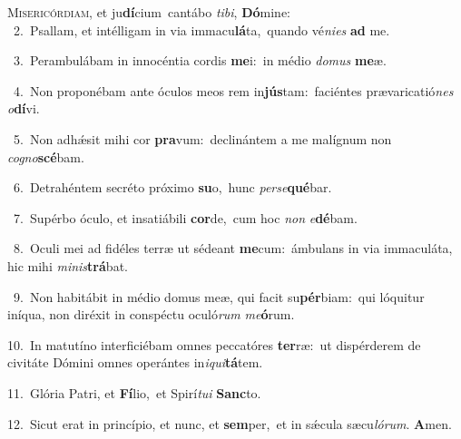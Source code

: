 \lettrine{\initial\textcolor{\initialcolor}{M}}{isericórdiam,} et ju\-\textbf{dí}\-cium~\star cantábo \textit{ti}\-\textit{bi}, \textbf{Dó}\-mine:\\
{\numbfont\textcolor{\numbcolor}{~2.}}~Psallam, et intélligam in via immacu\-\textbf{lá}\-ta,~\star quando vé\-\textit{ni}\-\textit{es} \textbf{ad} me.\par
{\numbfont\textcolor{\numbcolor}{~3.}}~Perambulábam in innocéntia cordis \textbf{me}\-i:~\star in médio \textit{do}\-\textit{mus} \textbf{me}\-æ.\par
{\numbfont\textcolor{\numbcolor}{~4.}}~Non proponébam ante óculos meos rem in\-\textbf{jús}\-tam:~\star faciéntes prævaricatió\textit{nes} \textit{o}\-\textbf{dí}vi.\par
{\numbfont\textcolor{\numbcolor}{~5.}}~Non adhǽsit mihi cor \textbf{pra}\-vum:~\star declinántem a me malígnum non \textit{co}\-\textit{gno}\textbf{scé}bam.\par
{\numbfont\textcolor{\numbcolor}{~6.}}~Detrahéntem secréto próximo \textbf{su}\-o,~\star hunc \textit{per}\-\textit{se}\textbf{qué}bar.\par
{\numbfont\textcolor{\numbcolor}{~7.}}~Supérbo óculo, et insatiábili \textbf{cor}\-de,~\star cum hoc \textit{non} \textit{e}\-\textbf{dé}bam.\par
{\numbfont\textcolor{\numbcolor}{~8.}}~Oculi mei ad fidéles terræ ut sédeant \textbf{me}\-cum:~\star ámbulans in via immaculáta, hic mihi \textit{mi}\-\textit{nis}\textbf{trá}bat.\par
{\numbfont\textcolor{\numbcolor}{~9.}}~Non habitábit in médio domus meæ, qui facit su\-\textbf{pér}\-biam:~\star qui lóquitur iníqua, non diréxit in conspéctu oculó\textit{rum} \textit{me}\-\textbf{ó}rum.\par
{\numbfont\textcolor{\numbcolor}{10.}}~In matutíno interficiébam omnes peccatóres \textbf{ter}\-ræ:~\star ut dispérderem de civitáte Dómini omnes operántes in\-\textit{i}\-\textit{qui}\textbf{tá}tem.\par
{\numbfont\textcolor{\numbcolor}{11.}}~Glória Patri, et \textbf{Fí}\-lio,~\star et Spirí\-\textit{tu}\-\textit{i} \textbf{Sanc}\-to.\par
{\numbfont\textcolor{\numbcolor}{12.}}~Sicut erat in princípio, et nunc, et \textbf{sem}\-per,~\star et in sǽcula sæcu\-\textit{ló}\-\textit{rum}. \textbf{A}\-men.\par
